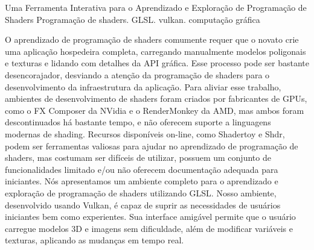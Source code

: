 
\begin{englishabstract}
{ Uma Ferramenta Interativa para o Aprendizado e Exploração de Programação de Shaders }
{ Programação de shaders. GLSL. vulkan. computação gráfica }

    O aprendizado de programação de shaders comumente requer que o novato crie uma aplicação hospedeira completa, carregando manualmente modelos poligonais e texturas e lidando com detalhes da API gráfica. Esse processo pode ser bastante desencorajador, desviando a atenção da programação de shaders para o desenvolvimento da infraestrutura da aplicação. Para aliviar esse trabalho, ambientes de desenvolvimento de shaders foram criados por fabricantes de GPUs, como o FX Composer da NVidia e o RenderMonkey da AMD, mas ambos foram descontinuados há bastante tempo, e não oferecem suporte a linguagens modernas de shading. Recursos disponíveis on-line, como Shadertoy e Shdr, podem ser ferramentas valiosas para ajudar no aprendizado de programação de shaders, mas costumam ser difíceis de utilizar, possuem um conjunto de funcionalidades limitado e/ou não oferecem documentação adequada para iniciantes. Nós apresentamos um ambiente completo para o aprendizado e exploração de programação de shaders utilizando GLSL. Nosso ambiente, desenvolvido usando Vulkan, é capaz de suprir as necessidades de usuários iniciantes bem como experientes. Sua interface amigável permite que o usuário carregue modelos 3D e imagens sem dificuldade, além de modificar variáveis e texturas, aplicando as mudanças em tempo real.

\end{englishabstract}
